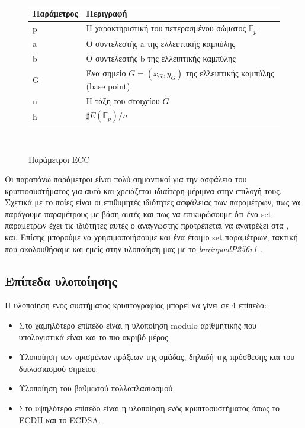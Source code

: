 \documentclass[12pt]{article}
\begin{document}
\begin{figure}[!htbp]
\begin{center}
\begin{tabular}{|l|l|} \hline
\textbf{Παράμετρος} & \textbf{Περιγραφή} \\ \hline
p & Η χαρακτηριστική του πεπερασμένου σώματος $\mathbb{F}_p$ \\ \hline
a & Ο συντελεστής a της ελλειπτικής καμπύλης \\ \hline
b & Ο συντελεστής b της ελλειπτικής καμπύλης \\ \hline
G & Ένα σημείο $G = (x_G, y_G)$ της ελλειπτικής καμπύλης (base point)  \\ \hline
n & Η τάξη του στοιχείου $G$ \\ \hline
h & $\sharp E(\mathbb{F}_p)/n$ \\ \hline
\end{tabular} \\
\end{center}
\caption{Παράμετροι ECC}
\end{figure}

Οι παραπάνω παράμετροι είναι πολύ σημαντικοί για την ασφάλεια του κρυπτοσυστήματος για αυτό και χρειάζεται ιδιαίτερη μέριμνα στην επιλογή τους. Σχετικά με το ποίες είναι οι επιθυμητές ιδιότητες ασφάλειας των παραμέτρων, πως να παράγουμε παραμέτρους με βάση αυτές και πως να επικυρώσουμε ότι ένα set παραμέτρων έχει τις ιδιότητες αυτές ο αναγνώστης προτρέπεται να ανατρέξει στα \cite{BPOOL}, \cite{SEC2} και\cite{ECDSA}.
Επίσης μπορούμε να χρησιμοποιήσουμε και ένα έτοιμο set παραμέτρων, τακτική που ακολουθήσαμε και εμείς στην υλοποίηση μας με το \emph{brainpoolP256r1} \cite{BPOOL}.

\subsection{Επίπεδα υλοποίησης}
Η υλοποίηση ενός συστήματος κρυπτογραφίας μπορεί να γίνει σε 4 επίπεδα:
\begin{itemize}
\item Στο χαμηλότερο επίπεδο είναι η υλοποίηση modulo αριθμητικής που υπολογιστικά είναι και το πιο ακριβό  μέρος.
\item Υλοποίηση των ορισμένων πράξεων της ομάδας, δηλαδή της πρόσθεσης και του διπλασιασμού σημείου.
\item Υλοποίηση του βαθμωτού πολλαπλασιασμού
\item Στο υψηλότερο επίπεδο είναι η υλοποίηση ενός κρυπτοσυστήματος όπως το ECDH και το ECDSA.
\end{itemize}
\end{document}
